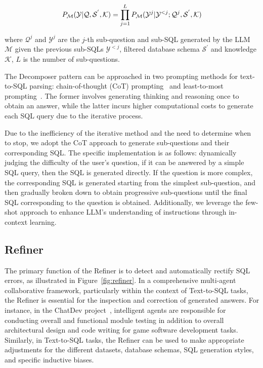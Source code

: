 \begin{equation}
\small
P_{\mathcal{M}}(\mathcal{Y} | \mathcal{Q}, \mathcal{S}^{'}, \mathcal{K}) = \prod_{j=1}^{L} P_{\mathcal{M}}(\mathcal{Y}^{j} | \mathcal{Y}^{<j}; \mathcal{Q}^{j}, \mathcal{S}^{'}, \mathcal{K})
\label{eq:decomposer}
\end{equation}

where $\mathcal{Q}^{j}$ and $\mathcal{Y}^{j}$ are the $j$-th sub-question and sub-SQL generated by the LLM $\mathcal{M}$ given the previous sub-SQLs $\mathcal{Y}^{<j}$, filtered database schema $\mathcal{S}^{'}$ and knowledge $\mathcal{K}$, $L$ is the number of sub-questions.

The Decomposer pattern can be approached in two prompting methods for text-to-SQL parsing: chain-of-thought (CoT) prompting~\citep{wei2023chainofthought} and least-to-most prompting~\citep{zhou2022least-to-most}.
The former involves generating thinking and reasoning once to obtain an answer, while the latter incurs higher computational costs to generate each SQL query due to the iterative process.

Due to the inefficiency of the iterative method and the need to determine when to stop, we adopt the CoT approach to generate sub-questions and their corresponding SQL.
The specific implementation is as follows: dynamically judging the difficulty of the user's question, if it can be answered by a simple SQL query, then the SQL is generated directly. 
If the question is more complex, the corresponding SQL is generated starting from the simplest sub-question, and then gradually broken down to obtain progressive sub-questions until the final SQL corresponding to the question is obtained. 
Additionally, we leverage the few-shot approach to enhance LLM's understanding of instructions through in-context learning.

\subsection{Refiner}
\label{sec:refiner}

The primary function of the Refiner is to detect and automatically rectify SQL errors, as illustrated in Figure~\ref{fig:refiner}. 
In a comprehensive multi-agent collaborative framework, particularly within the context of Text-to-SQL tasks, the Refiner is essential for the inspection and correction of generated answers. 
For instance, in the ChatDev project~\cite{qian2024chatdev}, intelligent agents are responsible for conducting overall and functional module testing in addition to overall architectural design and code writing for game software development tasks. 
Similarly, in Text-to-SQL tasks, the Refiner can be used to make appropriate adjustments for the different datasets, database schemas, SQL generation styles, and specific inductive biases.

